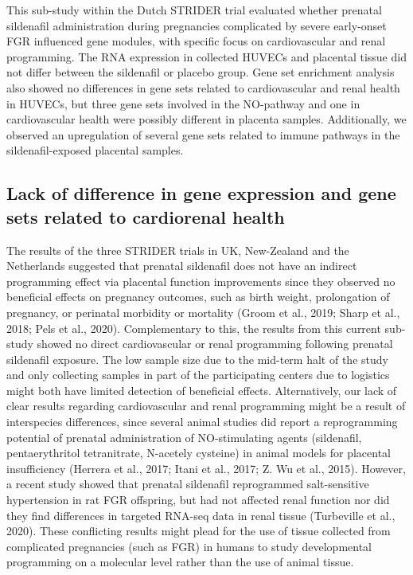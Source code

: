 \documentclass[authordate, empirical,issue]{jote-new-article}
\begin{document}
This sub-study within the Dutch STRIDER trial evaluated whether prenatal sildenafil administration during pregnancies complicated by severe early-onset FGR influenced gene modules, with specific focus on cardiovascular and renal programming. The RNA expression in collected HUVECs and placental tissue did not differ between the sildenafil or placebo group. Gene set enrichment analysis also showed no differences in gene sets related to cardiovascular and renal health in HUVECs, but three gene sets involved in the NO-pathway and one in cardiovascular health were possibly different in placenta samples. Additionally, we observed an upregulation of several gene sets related to immune pathways in the sildenafil-exposed placental samples.







\subsection{Lack of difference in gene expression and gene sets related to cardiorenal health}



The results of the three STRIDER trials in UK, New-Zealand and the Netherlands suggested that prenatal sildenafil does not have an indirect programming effect via placental function improvements since they observed no beneficial effects on pregnancy outcomes, such as birth weight, prolongation of pregnancy, or perinatal morbidity or mortality (Groom et al., 2019; Sharp et al., 2018; Pels et al., 2020). Complementary to this, the results from this current sub-study showed no direct cardiovascular or renal programming following prenatal sildenafil exposure. The low sample size due to the mid-term halt of the study and only collecting samples in part of the participating centers due to logistics might both have limited detection of beneficial effects. Alternatively, our lack of clear results regarding cardiovascular and renal programming might be a result of interspecies differences, since several animal studies did report a reprogramming potential of prenatal administration of NO-stimulating agents (sildenafil, pentaerythritol tetranitrate, N-acetely cysteine) in animal models for placental insufficiency (Herrera et al., 2017; Itani et al., 2017; Z. Wu et al., 2015). However, a recent study showed that prenatal sildenafil reprogrammed salt-sensitive hypertension in rat FGR offspring, but had not affected renal function nor did they find differences in targeted RNA-seq data in renal tissue (Turbeville et al., 2020). These conflicting results might plead for the use of tissue collected from complicated pregnancies (such as FGR) in humans to study developmental programming on a molecular level rather than the use of animal tissue.
\end{document}
